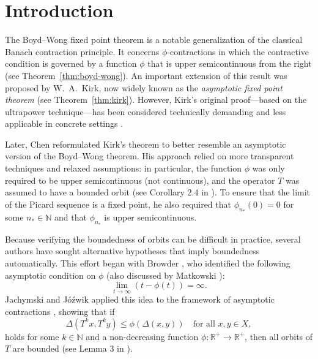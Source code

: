 \documentclass{birkjour}
\theoremstyle{definition}
\theoremstyle{remark}
\numberwithin{equation}{section}
\begin{document}
\maketitle

\section{Introduction}

The Boyd–Wong fixed point theorem is a notable generalization of the classical Banach contraction principle. It concerns $\phi$-contractions in which the contractive condition is governed by a function $\phi$ that is upper semicontinuous from the right (see Theorem~\ref{thm:boyd-wong}). An important extension of this result was proposed by W.~A.~Kirk, now widely known as the \emph{asymptotic fixed point theorem} (see Theorem~\ref{thm:kirk}). However, Kirk's original proof—based on the ultrapower technique—has been considered technically demanding and less applicable in concrete settings \cite{kirk2003}.

Later, Chen reformulated Kirk’s theorem to better resemble an asymptotic version of the Boyd–Wong theorem. His approach relied on more transparent techniques and relaxed assumptions: in particular, the function $\phi$ was only required to be upper semicontinuous (not continuous), and the operator $T$ was assumed to have a bounded orbit (see Corollary 2.4 in \cite{chen2005asymptotic}). To ensure that the limit of the Picard sequence is a fixed point, he also required that $\phi_{n_*}(0) = 0$ for some $n_* \in \mathbb{N}$ and that $\phi_{n_*}$ is upper semicontinuous.

Because verifying the boundedness of orbits can be difficult in practice, several authors have sought alternative hypotheses that imply boundedness automatically. This effort began with Browder \cite{browder1968}, who identified the following asymptotic condition on $\phi$ (also discussed by Matkowski \cite{matkowski1975integrable}):
\[
\lim_{t \to \infty} (t - \phi(t)) = \infty.
\]
Jachymski and Jóźwik applied this idea to the framework of asymptotic contractions \cite{jachymski2004}, showing that if
\[
\Delta(T^{k}x, T^{k}y) \leq \phi(\Delta(x, y)) \quad \text{for all } x, y \in X,
\]
holds for some $k \in \mathbb{N}$ and a non-decreasing function $\phi: \mathbb{R}^+ \to \mathbb{R}^+$, then all orbits of $T$ are bounded (see Lemma 3 in \cite{jachymski2004}).
\end{document}
